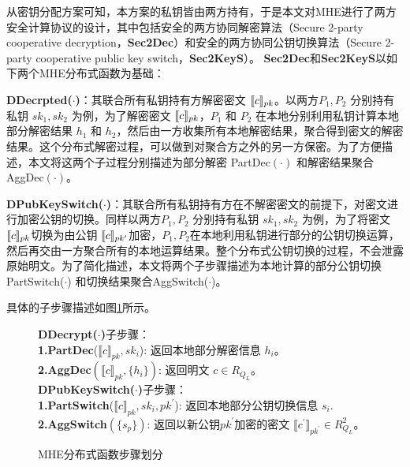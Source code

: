 从密钥分配方案可知，本方案的私钥皆由两方持有，于是本文对MHE进行了两方安全计算协议的设计，其中包括安全的两方协同解密算法（Secure 2-party cooperative decryption，\textbf{Sec2Dec}）和安全的两方协同公钥切换算法（Secure 2-party cooperative public key switch，\textbf{Sec2KeyS}）。
\textbf{Sec2Dec}和\textbf{Sec2KeyS}以如下两个MHE分布式函数为基础：
\begin{compactitem}
	\item \textbf{DDecrpted($\cdot$)}：其联合所有私钥持有方解密密文 $\ctx[pk]{c}$。以两方$P_1, P_2$ 分别持有私钥 $sk_1, sk_2$ 为例，为了解密密文 $\ctx[pk]{c}$，$P_1$ 和 $P_2$ 在本地分别利用私钥计算本地部分解密结果 $ h_1 $ 和 $ h_2 $，然后由一方收集所有本地解密结果，聚合得到密文的解密结果。这个分布式解密过程，可以做到对聚合方之外的另一方保密。为了方便描述，本文将这两个子过程分别描述为部分解密 PartDec$(\cdot)$ 和解密结果聚合 AggDec$(\cdot)$。
	\item  \textbf{DPubKeySwitch($ \cdot $)}：其联合所有私钥持有方在不解密密文的前提下，对密文进行加密公钥的切换。同样以两方$P_1, P_2$ 分别持有私钥 $sk_1, sk_2$ 为例，为了将密文$ \ctx[pk]{c} $切换为由公钥 $ \ctx[pk^{\prime}]{c} $加密，$ P_1,P_2 $在本地利用私钥进行部分的公钥切换运算，然后再交由一方聚合所有的本地运算结果。整个分布式公钥切换的过程，不会泄露原始明文。为了简化描述，本文将两个子步骤描述为本地计算的部分公钥切换PartSwitch($\cdot$) 和切换结果聚合AggSwitch($\cdot$)。
\end{compactitem}
具体的子步骤描述如图\ref{f2}所示。
\begin{figure}
	\begin{framed}
		\textbf{DDecrypt($\cdot$)}子步骤：\\
		\indent\textbf{1.PartDec}($\llbracket c\rrbracket_{pk},sk_i$): 返回本地部分解密信息 $h_i$。\\
		\indent\textbf{2.AggDec}$(\llbracket c\rrbracket_{pk},\{h_i\})$: 返回明文 $c\in R_{Q_{L}}$。\\
		
		\textbf{DPubKeySwitch($ \cdot $)}子步骤：\\
		\indent\textbf{1.PartSwitch}($\llbracket c\rrbracket_{pk},{sk_i},pk^{\prime}$): 返回本地部分公钥切换信息 $s_i$.\\
		\indent\textbf{2.AggSwitch}$(\{s_p\})$: 返回以新公钥$ pk^{\prime} $加密的密文 $\llbracket c^{\prime}\rrbracket_{pk^{\prime}} \in R^2_{Q_{L}}$。
	\end{framed}
	\caption{MHE分布式函数步骤划分}
	\label{f2}
\end{figure}


